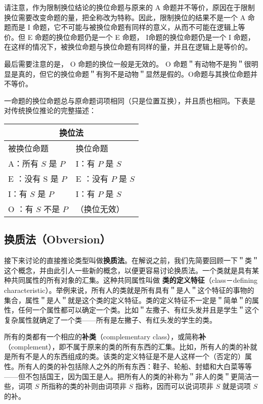 请注意，作为限制换位结论的换位命题与原来的 A 命题并不等价，原因在于限制换位需要改变命题的量，把全称改为特称。因此，限制换位的结果不是一个 A 命题而是 I 命题，它不可能与被换位命题有同样的意义，从而不可能在逻辑上等价。但 E 命题的换位命题仍是一个 E 命题， I命题的换位命题仍是一个 I 命题，在这样的情况下，被换位命题与换位命题有同样的量，并且在逻辑上是等价的。

最后需要注意的是， O 命题的换位一般是无效的。 O 命题＂有动物不是狗＂很明显是真的，但它的换位命题＂有狗不是动物＂显然是假的。O命题与其换位命题并不等价。

一命题的换位命题总与原命题词项相同（只是位置互换），并且质也相同。下表是对传统换位推论的完整描述：

\begin{center}
\begin{tabular}{|l|l|}
\hline
\multicolumn{2}{|c|}{换位法} \\
\hline
被换位命题 & 换位命题 \\
\hline
A：所有 $S$ 是 $P$ & I：有 $P$ 是 $S$ \\
\hline
E ：没有 S 是 $P$ & E ：没有 $P$ 是 $S$ \\
\hline
I：有 $S$ 是 $P$ & I：有 $P$ 是 $S$ \\
\hline
O ：有 $S$ 不是 $P$ & （换位无效） \\
\hline
\end{tabular}
\end{center}

\subsection{换质法（Obversion）}
接下来讨论的直接推论类型叫做\textbf{换质法}。在解说之前，我们先简要回顾一下＂类＂这个概念，并由此引人一些新的概念，以便更容易讨论换质法。一个类就是具有某种共同属性的所有对象的汇集。这种共同属性叫做 \textbf{类的定义特征}（class－defining characteristic）。举例来说，所有人的类就是所有具有＂是人＂这个特征的事物的集合，属性＂是人＂就是这个类的定义特征。类的定义特征不一定是＂简单＂的属性，任何一个属性都可以确定一个类。比如＂左撒子、有红头发并且是学生＂这个复杂属性就确定了一个类——所有是左撇子、有红头发的学生的类。

所有的类都有一个相应的\textbf{补类}（complementary class），或简称\textbf{补}（complement），即不属于原来的类的所有东西的汇集。比如，所有人的类的补就是所有不是人的东西组成的类。该类的定义特征是不是人这样一个（否定的）属性。所有人的类的补包括除人之外的所有东西：鞋子、轮船、封蜡和大白菜等等——但不包括国王，因为国王是人。把所有人的类的补称为＂非人的类＂更简洁一些，词项 $S$ 所指称的类的补则由词项非 $S$ 指称，因而可以说词项非 $S$ 就是词项 $S$ 的补。\cite{kneale1962}

